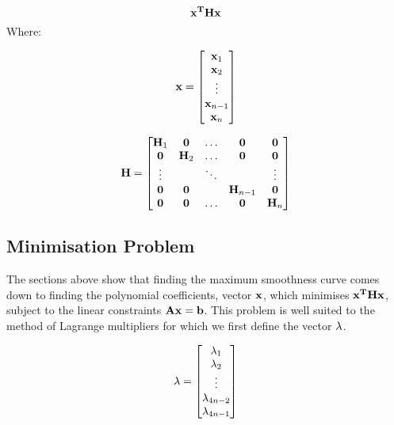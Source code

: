 \documentclass{article}
\begin{document}
\begin{equation}
    \mathbf{x^THx}
\end{equation}
Where:

\begin{equation*}
    \mathbf{x} = \begin{bmatrix}
        \mathbf{x}_1 \\
        \mathbf{x}_2 \\
        \vdots \\
        \mathbf{x}_{n-1} \\
        \mathbf{x}_n \\
    \end{bmatrix}
\end{equation*}

\begin{equation*}
    \mathbf{H} = \begin{bmatrix}
        \mathbf{H}_1 & \mathbf{0} & \hdots & \mathbf{0} & \mathbf{0} \\
        \mathbf{0} & \mathbf{H}_2 & \hdots & \mathbf{0} & \mathbf{0} \\
        \vdots & & \ddots & & \vdots \\
        \mathbf{0} & \mathbf{0} & & \mathbf{H}_{n-1} & \mathbf{0} \\
        \mathbf{0} & \mathbf{0} & \hdots & \mathbf{0} & \mathbf{H}_n
    \end{bmatrix}
\end{equation*}

\subsection{Minimisation Problem}
The sections above show that finding the maximum smoothness curve comes down to finding
the polynomial coefficients, vector $\mathbf{x}$, which minimises $\mathbf{x^THx}$, subject to the linear constraints
$\mathbf{Ax=b}$. This problem is well suited to the method of 
Lagrange multipliers for which we first define the vector $\mathbf{\lambda}$.

\begin{equation}
    \mathbf{\lambda} = \begin{bmatrix}
        \lambda_1 \\
        \lambda_2 \\
        \vdots \\
        \lambda_{4n-2} \\
        \lambda_{4n-1} \\
    \end{bmatrix}
\end{equation}

\newcommand{\Lagr}{\mathcal{L}}
\end{document}
